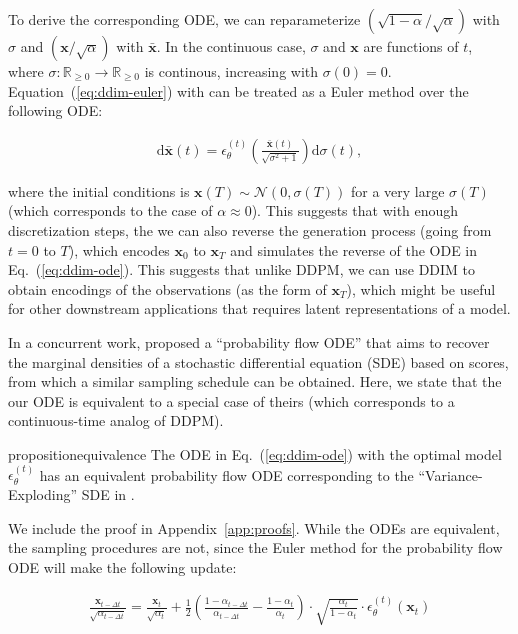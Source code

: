 To derive the corresponding ODE, we can reparameterize $(\sqrt{1 - \alpha} / \sqrt{\alpha})$ with $\sigma$ and $({\bm{x}} / \sqrt{\alpha})$ with $\bar{{\bm{x}}}$. In the continuous case, $\sigma$ and ${\bm{x}}$ are functions of $t$, where $\sigma: {\mathbb{R}}_{\geq 0} \to {\mathbb{R}}_{\geq 0}$ is continous, increasing with $\sigma(0) = 0$.
Equation~(\ref{eq:ddim-euler}) with can be treated as a Euler method over the following ODE:

\begin{align}
   \mathrm{d} \bar{{\bm{x}}}(t) = \epsilon_\theta^{(t)}\left(\frac{\bar{{\bm{x}}}(t)}{\sqrt{\sigma^2 + 1}}\right) \mathrm{d} \sigma(t) \label{eq:ddim-ode},
\end{align}

where the initial conditions is ${\bm{x}}(T) \sim {\mathcal{N}}(0, \sigma(T))$ for a very large $\sigma(T)$ (which corresponds to the case of $\alpha \approx 0$). This suggests that with enough discretization steps, the we can also reverse the generation process (going from $t = 0$ to $T$), which encodes ${\bm{x}}_0$ to ${\bm{x}}_T$ and simulates the reverse of the ODE in Eq.~(\ref{eq:ddim-ode}). This suggests that unlike DDPM, we can use DDIM to obtain encodings of the observations (as the form of ${\bm{x}}_T$), which might be useful for other downstream applications that requires latent representations of a model.

In a concurrent work, \citep{song2020score} proposed a ``probability flow ODE'' that aims to recover the marginal densities of a stochastic differential equation (SDE) based on scores, from which a similar sampling schedule can be obtained. Here, we state that the our ODE is equivalent to a special case of theirs (which corresponds to a continuous-time analog of DDPM).

\begin{restatable}{proposition}{equivalence}
The ODE in Eq.~(\ref{eq:ddim-ode}) with the optimal model $\epsilon_\theta^{(t)}$ has an equivalent probability flow ODE corresponding to the ``Variance-Exploding'' SDE in \citet{song2020score}.
\end{restatable}

We include the proof in Appendix~\ref{app:proofs}. While the ODEs are equivalent, the sampling procedures are not, since the Euler method for the probability flow ODE will make the following update:

\begin{align}
    \frac{{\bm{x}}_{t-\Delta t}}{\sqrt{\alpha_{t-\Delta t}}}  = \frac{{\bm{x}}_t}{\sqrt{\alpha_t}}  + \frac{1}{2}\left(\frac{1 - \alpha_{t-\Delta t}}{\alpha_{t-\Delta t}} - \frac{1 - \alpha_{t}}{\alpha_t}\right) \cdot \sqrt{\frac{\alpha_t}{1 - \alpha_t}} \cdot \epsilon_\theta^{(t)}({\bm{x}}_t) \label{eq:pf-euler}
\end{align}

